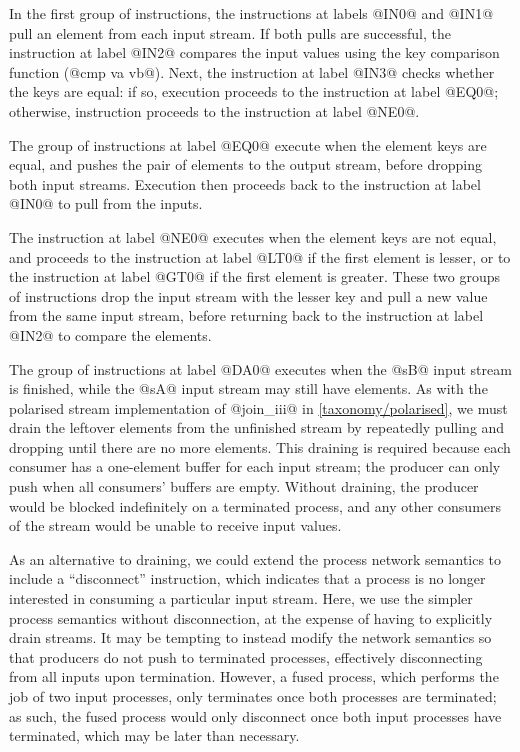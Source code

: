 In the first group of instructions, the instructions at labels @IN0@ and @IN1@ pull an element from each input stream.
If both pulls are successful, the instruction at label @IN2@ compares the input values using the key comparison function (@cmp va vb@).
Next, the instruction at label @IN3@ checks whether the keys are equal: if so, execution proceeds to the instruction at label @EQ0@; otherwise, instruction proceeds to the instruction at label @NE0@.

The group of instructions at label @EQ0@ execute when the element keys are equal, and pushes the pair of elements to the output stream, before dropping both input streams.
Execution then proceeds back to the instruction at label @IN0@ to pull from the inputs.

The instruction at label @NE0@ executes when the element keys are not equal, and proceeds to the instruction at label @LT0@ if the first element is lesser, or to the instruction at label @GT0@ if the first element is greater.
These two groups of instructions drop the input stream with the lesser key and pull a new value from the same input stream, before returning back to the instruction at label @IN2@ to compare the elements.

The group of instructions at label @DA0@ executes when the @sB@ input stream is finished, while the @sA@ input stream may still have elements.
As with the polarised stream implementation of @join_iii@ in \cref{taxonomy/polarised}, we must drain the leftover elements from the unfinished stream by repeatedly pulling and dropping until there are no more elements.
This draining is required because each consumer has a one-element buffer for each input stream; the producer can only push when all consumers' buffers are empty.
Without draining, the producer would be blocked indefinitely on a terminated process, and any other consumers of the stream would be unable to receive input values.

As an alternative to draining, we could extend the process network semantics to include a ``disconnect'' instruction, which indicates that a process is no longer interested in consuming a particular input stream.
Here, we use the simpler process semantics without disconnection, at the expense of having to explicitly drain streams.
It may be tempting to instead modify the network semantics so that producers do not push to terminated processes, effectively disconnecting from all inputs upon termination.
However, a fused process, which performs the job of two input processes, only terminates once both processes are terminated; as such, the fused process would only disconnect once both input processes have terminated, which may be later than necessary.


